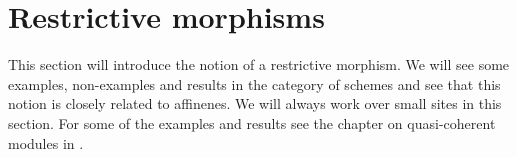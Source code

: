 \chapter{Restrictive morphisms}
This section will introduce the notion of a restrictive morphism.
We will see some examples, non-examples and results in the category of schemes
and see that this notion is closely related to affinenes.
We will always work over small sites in this section.
For some of the examples and results see the chapter on quasi-coherent modules in \cite{vakil}.










